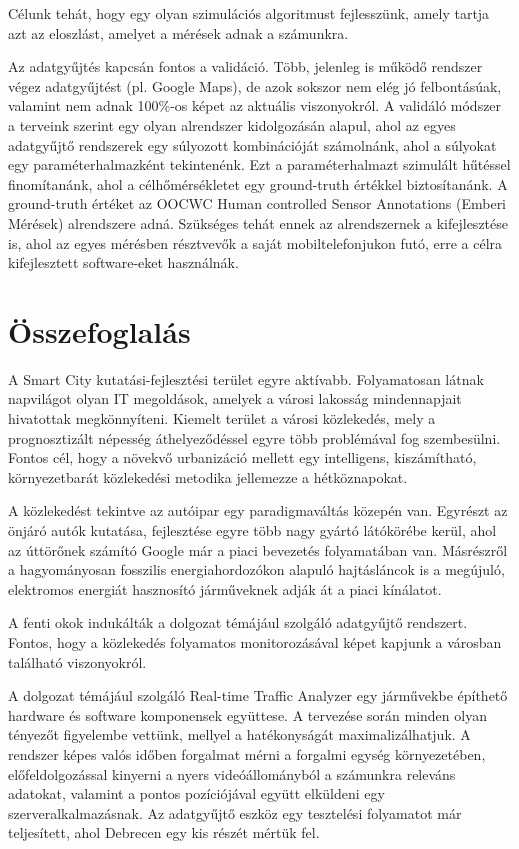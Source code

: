 \documentclass[a4paper,12pt]{report}
\begin{document}
Célunk tehát, hogy egy olyan szimulációs algoritmust fejlesszünk, amely tartja azt az eloszlást, amelyet a mérések adnak a számunkra.

Az adatgyűjtés kapcsán fontos a validáció. Több, jelenleg is működő rendszer végez adatgyűjtést (pl. Google Maps), de azok sokszor nem elég jó felbontásúak, valamint nem adnak 100\%-os képet az aktuális viszonyokról. A validáló módszer a terveink szerint egy olyan alrendszer kidolgozásán alapul, ahol az egyes adatgyűjtő rendszerek egy súlyozott kombinációját számolnánk, ahol a súlyokat egy paraméterhalmazként tekintenénk. Ezt a paraméterhalmazt szimulált hűtéssel finomítanánk, ahol a célhőmérsékletet egy ground-truth értékkel biztosítanánk. A ground-truth értéket az OOCWC Human controlled Sensor Annotations (Emberi Mérések) alrendszere adná. Szükséges tehát ennek az alrendszernek a kifejlesztése is, ahol az egyes mérésben résztvevők a saját mobiltelefonjukon futó, erre a célra kifejlesztett software-eket használnák.

\chapter{Összefoglalás}
\label{summary}

A Smart City kutatási-fejlesztési terület egyre aktívabb. Folyamatosan látnak napvilágot olyan IT megoldások, amelyek a városi lakosság mindennapjait hivatottak megkönnyíteni. Kiemelt terület a városi közlekedés, mely a prognosztizált népesség áthelyeződéssel egyre több problémával fog szembesülni. Fontos cél, hogy a növekvő urbanizáció mellett egy intelligens, kiszámítható, környezetbarát közlekedési metodika jellemezze a hétköznapokat.

A közlekedést tekintve az autóipar egy paradigmaváltás közepén van. Egyrészt az önjáró autók kutatása, fejlesztése egyre több nagy gyártó látókörébe kerül, ahol az úttörőnek számító Google már a piaci bevezetés folyamatában van. Másrészről a hagyományosan fosszilis energiahordozókon alapuló hajtásláncok is a megújuló, elektromos energiát hasznosító járműveknek adják át a piaci kínálatot.

A fenti okok indukálták a dolgozat témájául szolgáló adatgyűjtő rendszert. Fontos, hogy a közlekedés folyamatos monitorozásával képet kapjunk a városban található viszonyokról. 

A dolgozat témájául szolgáló Real-time Traffic Analyzer egy járművekbe építhető hardware és software komponensek együttese. A tervezése során minden olyan tényezőt figyelembe vettünk, mellyel a hatékonyságát maximalizálhatjuk. A rendszer képes valós időben forgalmat mérni a forgalmi egység környezetében, előfeldolgozással kinyerni a nyers videóállományból a számunkra releváns adatokat, valamint a pontos pozíciójával együtt elküldeni egy szerveralkalmazásnak. Az adatgyűjtő eszköz egy tesztelési folyamatot már teljesített, ahol Debrecen egy kis részét mértük fel.
\end{document}

